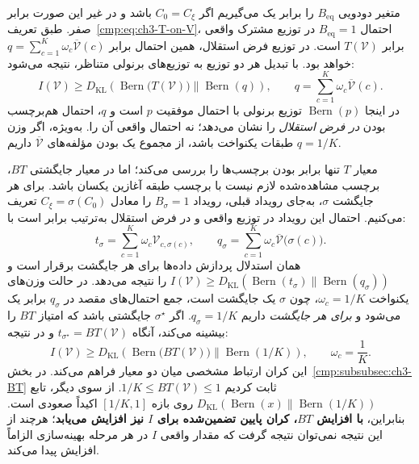 متغیر دودویی $B_{\mathrm{eq}}$ را برابر یک می‌گیریم اگر $C_0=C_\xi$ باشد و در غیر این صورت برابر صفر. طبق تعریف~\eqref{cmp:eq:ch3-T-on-V}، احتمال $B_{\mathrm{eq}}=1$ در توزیع مشترک واقعی برابر $T(\mathcal V)$ است. در توزیع فرض استقلال، همین احتمال برابر $q=\sum_{c=1}^{K}\omega_c\overline{\mathcal V}(c)$ خواهد بود. با تبدیل هر دو توزیع به توزیع‌های برنولی متناظر، نتیجه می‌شود:
\begin{equation}\label{cmp:eq:ch3-I-vs-T}
\boxed{
I(\mathcal V)\ge
D_{\mathrm{KL}}\!\left(
\operatorname{Bern}\bigl(T(\mathcal V)\bigr)
\middle\|
\operatorname{Bern}(q)
\right),\qquad
q=\sum_{c=1}^{K}\omega_c\overline{\mathcal V}(c).
}
\end{equation}
در اینجا $\operatorname{Bern}(p)$ توزیع برنولی با احتمال موفقیت $p$ است و $q$، احتمال هم‌برچسب بودن \emph{در فرض استقلال} را نشان می‌دهد؛ نه احتمال واقعی آن را. به‌ویژه، اگر وزن طبقات یکنواخت باشد، از مجموع یک بودن مؤلفه‌های $\overline{\mathcal V}$ داریم $q=1/K$.

معیار $T$ تنها برابر بودن برچسب‌ها را بررسی می‌کند؛ اما در معیار جایگشتی $BT$، برچسب مشاهده‌شده لازم نیست با برچسب طبقه آغازین یکسان باشد. برای هر جایگشت $\sigma$، به‌جای رویداد قبلی، رویداد $B_\sigma=1$ را معادل $C_\xi=\sigma(C_0)$ تعریف می‌کنیم. احتمال این رویداد در توزیع واقعی و در فرض استقلال به‌ترتیب برابر است با:
\begin{equation}\label{cmp:eq:ch3-I-BT-event-probs}
t_\sigma=\sum_{c=1}^{K}\omega_c\mathcal V_{c,\sigma(c)},
\qquad
q_\sigma=\sum_{c=1}^{K}\omega_c\overline{\mathcal V}\bigl(\sigma(c)\bigr).
\end{equation}
همان استدلال پردازش داده‌ها برای هر جایگشت برقرار است و $I(\mathcal V)\ge D_{\mathrm{KL}}(\operatorname{Bern}(t_\sigma)\|\operatorname{Bern}(q_\sigma))$ را نتیجه می‌دهد. در حالت وزن‌های یکنواخت $\omega_c=1/K$، چون $\sigma$ یک جایگشت است، جمع احتمال‌های مقصد در $q_\sigma$ برابر یک می‌شود و \emph{برای هر جایگشت} داریم $q_\sigma=1/K$. اگر $\sigma^\star$ جایگشتی باشد که امتیاز $BT$ را بیشینه می‌کند، آنگاه $t_{\sigma^\star}=BT(\mathcal V)$ و در نتیجه:
\begin{equation}\label{cmp:eq:ch3-I-vs-BT}
\boxed{
I(\mathcal V)\ge
D_{\mathrm{KL}}\!\left(
\operatorname{Bern}\bigl(BT(\mathcal V)\bigr)
\middle\|
\operatorname{Bern}(1/K)
\right),\qquad \omega_c=\frac{1}{K}.
}
\end{equation}
این کران ارتباط مشخصی میان دو معیار فراهم می‌کند. در بخش~\ref{cmp:subsubsec:ch3-BT} ثابت کردیم $1/K\le BT(\mathcal V)\le1$. از سوی دیگر، تابع $D_{\mathrm{KL}}(\operatorname{Bern}(x)\|\operatorname{Bern}(1/K))$ روی بازه $[1/K,1]$ اکیداً صعودی است. بنابراین، \textbf{با افزایش $BT$، کران پایین تضمین‌شده برای $I$ نیز افزایش می‌یابد}؛ هرچند از این نتیجه نمی‌توان نتیجه گرفت که مقدار واقعی $I$ در هر مرحله بهینه‌سازی الزاماً افزایش پیدا می‌کند.

